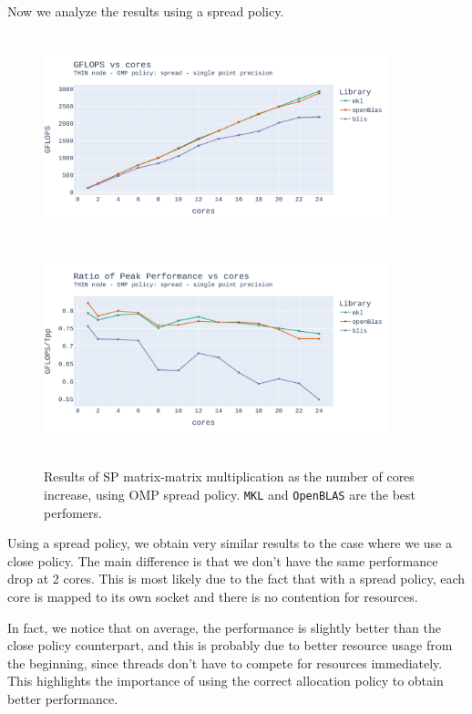 \documentclass{report}
\begin{document}
Now we analyze the results using a spread policy.

\begin{figure}[H]
\hspace*{-2.5cm}
\includegraphics[width=10cm, height=6cm]{./images/fixed_size_thin_float_gflops_spread.pdf}
\includegraphics[width=10cm, height=6cm]{./images/fixed_size_thin_float_gflops_spread_ratio.pdf}
\caption{\label{fig:fixed_size_thin_float_spread} Results of SP matrix-matrix multiplication 
    as the number of cores increase, using OMP spread policy. \texttt{MKL} 
and \texttt{OpenBLAS} are the best perfomers.}
\end{figure}

Using a spread policy, we obtain very similar results to the case where we use 
a close policy. The main difference is that we don't have the same performance 
drop at 2 cores. This is most likely due to the fact that with a spread policy, 
each core is mapped to its own socket and there is no contention for resources. 

In fact, we notice that on average, the performance is slightly better than the 
close policy counterpart, and this is probably due to better resource usage 
from the beginning, since threads don't have to compete for resources immediately.
This highlights the importance of using the correct allocation policy to obtain 
better performance.
\end{document}
